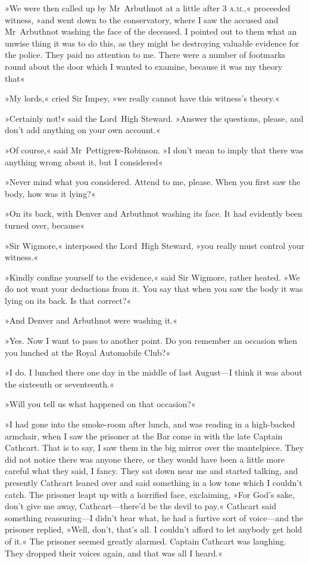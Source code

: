 »We were then called up by Mr~Arbuthnot at a little after 3 \textsc{a.m.},« proceeded witness, »and went down to the conservatory, where I saw the accused and Mr~Arbuthnot washing the face of the deceased. I pointed out to them what an unwise thing it was to do this, as they might be destroying valuable evidence for the police. They paid no attention to me. There were a number of footmarks round about the door which I wanted to examine, because it was my theory that\longdash«

»My lords,« cried Sir Impey, »we really cannot have this witness's theory.«

»Certainly not!« said the Lord~High Steward. »Answer the questions, please, and don't add anything on your own account.«

»Of course,« said Mr~Pettigrew-Robinson. »I don't mean to imply that there was anything wrong about it, but I considered\longdash«

»Never mind what you considered. Attend to me, please. When you first saw the body, how was it lying?«

»On its back, with Denver and Arbuthnot washing its face. It had evidently been turned over, because\longdash«

»Sir Wigmore,« interposed the Lord~High Steward, »you really must control your witness.«

»Kindly confine yourself to the evidence,« said Sir Wigmore, rather heated. »We do not want your deductions from it. You say that when you saw the body it was lying on its back. Is that correct?«

»And Denver and Arbuthnot were washing it.«

»Yes. Now I want to pass to another point. Do you remember an occasion when you lunched at the Royal Automobile Club?«

»I do. I lunched there one day in the middle of last August—I think it was about the sixteenth or seventeenth.«

»Will you tell us what happened on that occasion?«

»I had gone into the smoke-room after lunch, and was reading in a high-backed armchair, when I saw the prisoner at the Bar come in with the late Captain Cathcart. That is to say, I saw them in the big mirror over the mantelpiece. They did not notice there was anyone there, or they would have been a little more careful what they said, I fancy.  They sat down near me and started talking, and presently Cathcart leaned over and said something in a low tone which I couldn't catch.  The prisoner leapt up with a horrified face, exclaiming, »For God's sake, don't give me away, Cathcart—there'd be the devil to pay.« Cathcart said something reassuring—I didn't hear what, he had a furtive sort of voice—and the prisoner replied, »Well, don't, that's all. I couldn't afford to let anybody get hold of it.« The prisoner seemed greatly alarmed. Captain Cathcart was laughing. They dropped their voices again, and that was all I heard.«

